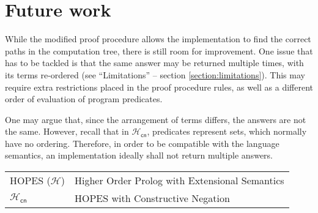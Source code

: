 \documentclass[inscr,ack,preface]{dithesis}
\theoremstyle{definition}
\newcommand{\hcn}{$\mathcal{H}_\mathsf{cn}$}
\begin{document}
\section{Future work}
While the modified proof procedure allows the implementation to find the correct paths in the computation tree, there is still room for improvement. One issue that has to be tackled is that the same answer may be returned multiple times, with its terms re-ordered (see ``Limitations'' -- section \ref{section:limitations}). This may require extra restrictions placed in the proof procedure rules, as well as a different order of evaluation of program predicates.

One may argue that, since the arrangement of terms differs, the answers are not the same. However, recall that in \hcn{}, predicates represent sets, which normally have no ordering. Therefore, in order to be compatible with the language semantics, an implementation ideally shall not return multiple answers.

\backmatter

\abbreviations
\begin{center}
	\renewcommand{\arraystretch}{1.5}
	\begin{longtable}{ l @{\qquad} l }
	\toprule
	  HOPES ($\mathcal{H}$)    & Higher Order Prolog with Extensional Semantics \\
    \hcn{}   & HOPES with Constructive Negation \\
	\bottomrule
	\end{longtable}
\end{center}

%
%
%



\end{document}
